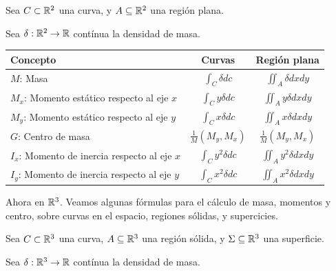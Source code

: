 Sea $ C \subset \mathbb{R}^2$ una curva, y $A \subseteq \mathbb{R}^2$ una región plana.

Sea $ \delta: \mathbb{R}^2 \to \mathbb{R}$ contínua la densidad de masa.

\begin{center}
\begin{tabular}{|p{4cm}|c|c| }
  \hline
  Concepto                               & Curvas                       & Región plana                    \\
  \hline
  \hline
  $M$: Masa                                   & $\int_C \delta dc$       & $\iint_A \delta dxdy$       \\
  \hline
  $M_x$: Momento estático respecto al eje $x$   & $\int_C y \delta dc$   & $\iint_A y \delta dxdy$   \\
  \hline
  $M_y$: Momento estático respecto al eje $y$   & $\int_C x \delta dc$   & $\iint_A x \delta dxdy$   \\
  \hline
  $G$: Centro de masa                         & $ \frac{1}{M} (M_y, M_x)$ & $ \frac{1}{M} (M_y, M_x)$    \\
  \hline
  $I_x$: Momento de inercia respecto al eje $x$ & $ \int_C y^2 \delta dc$ & $\iint_A y^2 \delta dxdy$ \\
  \hline
  $I_y$: Momento de inercia respecto al eje $y$ & $ \int_C x^2 \delta dc$ & $ \iint_A x^2 \delta dxdy$ \\
  \hline

\end{tabular}
\end{center}


Ahora en $\mathbb{R}^3$.  Veamos algunas fórmulas para el cálculo de masa, momentos y centro, sobre curvas en el espacio, regiones sólidas, y supercicies.

Sea $ C \subset \mathbb{R}^3$ una curva, $A \subseteq \mathbb{R}^3$ una región sólida, y $\Sigma \subseteq \mathbb{R}^3$ una superficie.

Sea $ \delta: \mathbb{R}^3 \to \mathbb{R}$ contínua la densidad de masa.

\onecolumn

